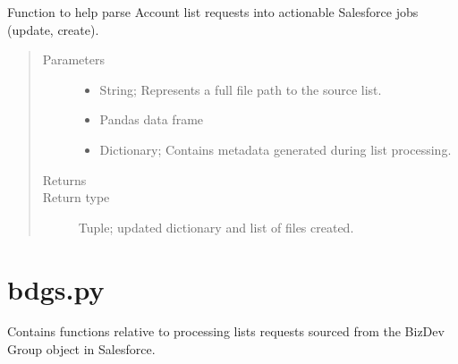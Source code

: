 \documentclass[letterpaper,10pt,english]{sphinxmanual}
\begin{document}
\begin{fulllineitems}
\label{\detokenize{index:ListManagement.sources.accounts.parse}}
Function to help parse Account list requests into
actionable Salesforce jobs (update, create).
\begin{quote}\begin{description}
\item[{Parameters}] \leavevmode\begin{itemize}
\item {} 
 \textendash{} String; Represents a full file path to the source list.

\item {} 
 \textendash{} Pandas data frame

\item {} 
 \textendash{} Dictionary; Contains metadata generated during list processing.

\end{itemize}

\item[{Returns}] \leavevmode


\item[{Return type}] \leavevmode
Tuple; updated dictionary and list of files created.

\end{description}\end{quote}

\end{fulllineitems}

\label{\detokenize{index:module-ListManagement.sources.bdgs}}

\section{bdgs.py}
\label{\detokenize{index:bdgs-py}}
Contains functions relative to processing
lists requests sourced from the BizDev Group
object in Salesforce.
\end{document}
